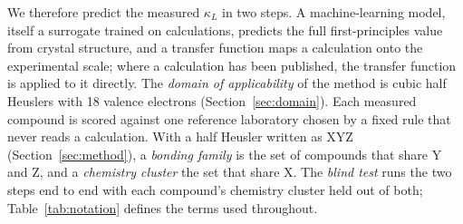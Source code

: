We therefore predict the measured $\kappa_L$ in two steps. A machine-learning model, itself a
surrogate trained on calculations, predicts the full first-principles value from crystal
structure, and a transfer function maps a calculation onto the experimental scale; where a
calculation has been published, the transfer function is applied to it directly. The
\emph{domain of applicability} of the method is cubic half Heuslers with 18 valence electrons
(Section~\ref{sec:domain}). Each measured compound is scored against one reference laboratory
chosen by a fixed rule that never reads a calculation. With a half Heusler written as XYZ
(Section~\ref{sec:method}), a \emph{bonding family} is the set of compounds that share Y and Z,
and a \emph{chemistry cluster} the set that share X. The \emph{blind test} runs the two steps end
to end with each compound's chemistry cluster held out of both; Table~\ref{tab:notation} defines
the terms used throughout.

